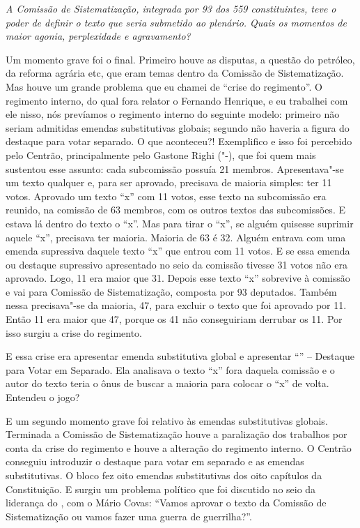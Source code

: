 \medskip

\noindent\emph{A Comissão de Sistematização, integrada por 93 dos 559
constituintes, teve o poder de definir o texto que seria submetido ao
plenário. Quais os momentos de maior agonia, perplexidade e
agravamento?}

Um momento grave foi o final. Primeiro houve as
disputas, a questão do petróleo, da reforma agrária etc, que eram temas
dentro da Comissão de Sistematização. Mas houve um grande problema que
eu chamei de ``crise do regimento''. O regimento interno, do qual fora
relator o Fernando Henrique, e eu trabalhei com ele nisso, nós prevíamos
o regimento interno do seguinte modelo: primeiro não seriam admitidas
emendas substitutivas globais; segundo não haveria a figura do destaque
para votar separado. O que aconteceu?! Exemplifico e isso foi percebido
pelo Centrão, principalmente pelo Gastone Righi ("-), que foi quem
mais sustentou esse assunto: cada subcomissão possuía 21 membros.
Apresentava"-se um texto qualquer e, para ser aprovado, precisava de
maioria simples: ter 11 votos. Aprovado um texto ``x'' com 11 votos, esse
texto na subcomissão era reunido, na comissão de 63 membros, com os
outros textos das subcomissões. E estava lá dentro do texto o ``x''. Mas
para tirar o ``x'', se alguém quisesse suprimir aquele ``x'', precisava ter
maioria. Maioria de 63 é 32. Alguém entrava com uma emenda supressiva
daquele texto ``x'' que entrou com 11 votos. E se essa emenda ou
destaque supressivo apresentado no seio da comissão tivesse 31 votos não
era aprovado. Logo, 11 era maior que 31. Depois esse texto ``x'' sobrevive
à comissão e vai para Comissão de Sistematização, composta por 93
deputados. Também nessa precisava"-se da maioria, 47, para excluir o
texto que foi aprovado por 11. Então 11 era maior que 47, porque os 41
não conseguiriam derrubar os 11. Por isso surgiu a crise do regimento.

E essa crise era apresentar emenda substitutiva global e apresentar
``'' -- Destaque para Votar em Separado. Ela analisava o texto ``x'' fora
daquela comissão e o autor do texto teria o ônus de buscar a maioria
para colocar o ``x'' de volta. Entendeu o jogo?

E um segundo momento grave foi relativo às emendas substitutivas
globais. Terminada a Comissão de Sistematização houve a paralização dos
trabalhos por conta da crise do regimento e houve a alteração do
regimento interno. O Centrão conseguiu introduzir o destaque para votar
em separado e as emendas substitutivas. O bloco fez oito emendas
substitutivas dos oito capítulos da Constituição. E surgiu um problema
político que foi discutido no seio da liderança do , com o Mário
Covas: ``Vamos aprovar o texto da Comissão de Sistematização ou vamos
fazer uma guerra de guerrilha?''.

